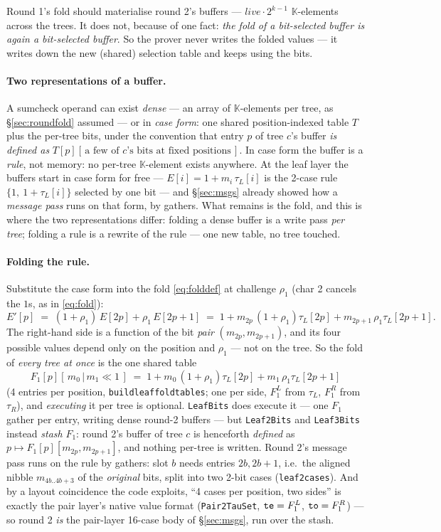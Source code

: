 \documentclass[11pt]{article}
\newcommand{\K}{\mathbb{K}}            %
\newcommand{\code}[1]{{\def\_{\textunderscore\allowbreak}\texttt{#1}}}
\theoremstyle{definition}
\begin{document}
Round 1's fold should materialise round 2's buffers ---
$\mathit{live}\cdot 2^{k-1}$ $\K$-elements across the trees.  It does
not, because of one fact: \emph{the fold of a bit-selected buffer is
again a bit-selected buffer}.  So the prover never writes the folded
values --- it writes down the new (shared) selection table and keeps
using the bits.

\paragraph{Two representations of a buffer.}
A sumcheck operand can exist \emph{dense} --- an array of
$\K$-elements per tree, as \S\ref{sec:roundfold} assumed --- or in
\emph{case form}: one shared position-indexed table $T$ plus the
per-tree bits, under the convention that entry $p$ of tree $c$'s
buffer \emph{is defined as} $T[p][\,\text{a few of $c$'s bits at fixed
positions}\,]$.  In case form the buffer is a \emph{rule}, not memory:
no per-tree $\K$-element exists anywhere.  At the leaf layer the
buffers start in case form for free --- $E[i] = 1 + m_i\,\tau_L[i]$ is
the 2-case rule $\{1,\ 1{+}\tau_L[i]\}$ selected by one bit --- and
\S\ref{sec:msgs} already showed how a \emph{message pass} runs on that
form, by gathers.  What remains is the fold, and this is where the two
representations differ: folding a dense buffer is a write pass
\emph{per tree}; folding a rule is a rewrite of the rule --- one new
table, no tree touched.

\paragraph{Folding the rule.}
Substitute the case form into the fold \eqref{eq:folddef} at challenge
$\rho_1$ (char 2 cancels the $1$s, as in \eqref{eq:fold}):
\[
  E'[p] \;=\; (1{+}\rho_1)\,E[2p] + \rho_1\,E[2p{+}1]
  \;=\; 1 + m_{2p}\,(1{+}\rho_1)\tau_L[2p]
          + m_{2p+1}\,\rho_1\tau_L[2p{+}1].
\]
The right-hand side is a function of the bit \emph{pair}
$(m_{2p}, m_{2p+1})$, and its four possible values depend only on the
position and $\rho_1$ --- not on the tree.  So the fold of \emph{every
tree at once} is the one shared table
\[
  F_1[p][\,m_0 \,|\, m_1{\ll}1\,] \;=\;
  1 + m_0\,(1{+}\rho_1)\tau_L[2p] + m_1\,\rho_1\tau_L[2p{+}1]
\]
(4 entries per position, \code{build\_leaf\_fold\_tables}; one per
side, $F_1^L$ from $\tau_L$, $F_1^R$ from $\tau_R$), and
\emph{executing} it per tree is optional.  \code{LeafBits} does
execute it --- one $F_1$ gather per entry, writing dense round-2
buffers --- but \code{Leaf2Bits} and \code{Leaf3Bits} instead
\emph{stash} $F_1$: round 2's buffer of tree $c$ is henceforth
\emph{defined} as $p \mapsto F_1[p][m_{2p}, m_{2p+1}]$, and nothing
per-tree is written.  Round 2's message pass runs on the rule by
gathers: slot $b$ needs entries $2b, 2b{+}1$, i.e.\ the aligned nibble
$m_{4b..4b+3}$ of the \emph{original} bits, split into two 2-bit
cases (\code{leaf2\_cases}).  And by a layout coincidence the code
exploits, ``4 cases per position, two sides'' is exactly the pair
layer's native value format (\code{Pair2TauSet},
$\code{te} = F_1^L$, $\code{to} = F_1^R$) --- so round 2 \emph{is}
the pair-layer 16-case body of \S\ref{sec:msgs}, run over the stash.
\end{document}
